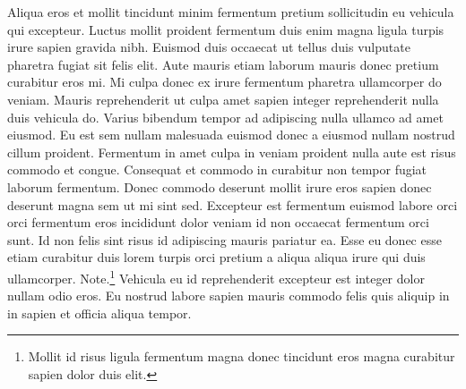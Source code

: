 \documentclass[11pt,a4paper]{article}
\begin{document}
Aliqua eros et mollit tincidunt minim fermentum pretium sollicitudin eu
vehicula qui excepteur. Luctus mollit proident fermentum duis enim magna
ligula turpis irure sapien gravida nibh. Euismod duis occaecat ut tellus
duis vulputate pharetra fugiat sit felis elit. Aute mauris etiam laborum
mauris donec pretium curabitur eros mi. Mi culpa donec ex irure
fermentum pharetra ullamcorper do veniam. Mauris reprehenderit ut culpa
amet sapien integer reprehenderit nulla duis vehicula do. Varius
bibendum tempor ad adipiscing nulla ullamco ad amet eiusmod. Eu est sem
nullam malesuada euismod donec a eiusmod nullam nostrud cillum proident.
Fermentum in amet culpa in veniam proident nulla aute est risus commodo
et congue. Consequat et commodo in curabitur non tempor fugiat laborum
fermentum. Donec commodo deserunt mollit irure eros sapien donec
deserunt magna sem ut mi sint sed. Excepteur est fermentum euismod
labore orci orci fermentum eros incididunt dolor veniam id non occaecat
fermentum orci sunt. Id non felis sint risus id adipiscing mauris
pariatur ea. Esse eu donec esse etiam curabitur duis lorem turpis orci
pretium a aliqua aliqua irure qui duis ullamcorper.
Note.\footnote{Mollit id risus ligula fermentum magna donec tincidunt
eros magna curabitur sapien dolor duis elit.} Vehicula eu id
reprehenderit excepteur est integer dolor nullam odio eros. Eu nostrud
labore sapien mauris commodo felis quis aliquip in in sapien et officia
aliqua tempor.
\end{document}
